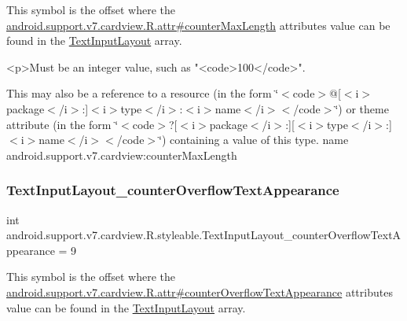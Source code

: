 This symbol is the offset where the \hyperlink{classandroid_1_1support_1_1v7_1_1cardview_1_1R_1_1attr_a353e93d414f0a1430ad4bbdcb581d346}{android.\+support.\+v7.\+cardview.\+R.\+attr\#counter\+Max\+Length} attribute\textquotesingle{}s value can be found in the \hyperlink{classandroid_1_1support_1_1v7_1_1cardview_1_1R_1_1styleable_a9b23c31ffaf354f0f5cc4b82392ef6a4}{Text\+Input\+Layout} array.

\begin{DoxyVerb}      <p>Must be an integer value, such as "<code>100</code>".
\end{DoxyVerb}
 

This may also be a reference to a resource (in the form \char`\"{}$<$code$>$@\mbox{[}$<$i$>$package$<$/i$>$\+:\mbox{]}$<$i$>$type$<$/i$>$\+:$<$i$>$name$<$/i$>$$<$/code$>$\char`\"{}) or theme attribute (in the form \char`\"{}$<$code$>$?\mbox{[}$<$i$>$package$<$/i$>$\+:\mbox{]}\mbox{[}$<$i$>$type$<$/i$>$\+:\mbox{]}$<$i$>$name$<$/i$>$$<$/code$>$\char`\"{}) containing a value of this type.  name android.\+support.\+v7.\+cardview\+:counter\+Max\+Length \mbox{\label{classandroid_1_1support_1_1v7_1_1cardview_1_1R_1_1styleable_a96e59cae084e4729e31f7abe43a12b5c}} 
\subsubsection{\texorpdfstring{Text\+Input\+Layout\+\_\+counter\+Overflow\+Text\+Appearance}{TextInputLayout\_counterOverflowTextAppearance}}
{\footnotesize\ttfamily int android.\+support.\+v7.\+cardview.\+R.\+styleable.\+Text\+Input\+Layout\+\_\+counter\+Overflow\+Text\+Appearance = 9\hspace{0.3cm}{\ttfamily [static]}}

This symbol is the offset where the \hyperlink{classandroid_1_1support_1_1v7_1_1cardview_1_1R_1_1attr_a4a957d4beac1d3f3d9fd8967db38630c}{android.\+support.\+v7.\+cardview.\+R.\+attr\#counter\+Overflow\+Text\+Appearance} attribute\textquotesingle{}s value can be found in the \hyperlink{classandroid_1_1support_1_1v7_1_1cardview_1_1R_1_1styleable_a9b23c31ffaf354f0f5cc4b82392ef6a4}{Text\+Input\+Layout} array.

